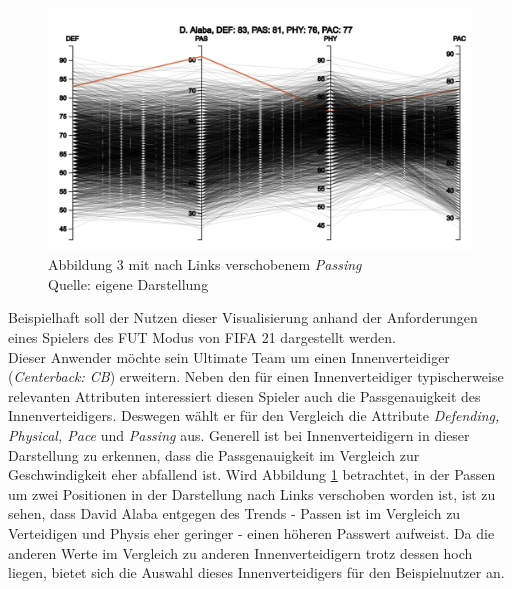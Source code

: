 \documentclass[usegeometry=true]{scrartcl}
\begin{document}
\begin{figure}[h!]
\centering
\includegraphics[scale=0.46]{grafiken/ParalleleKoordinaten51}
\caption{Abbildung 3 mit nach Links verschobenem \textit{Passing}\\ Quelle: eigene Darstellung}
\label{PK51}
\end{figure}
Beispielhaft soll der Nutzen dieser Visualisierung anhand der Anforderungen eines Spielers des FUT Modus von FIFA 21 dargestellt werden.\\
Dieser Anwender möchte sein Ultimate Team um einen Innenverteidiger (\textit{Centerback: CB}) erweitern. Neben den für einen Innenverteidiger typischerweise relevanten Attributen interessiert diesen Spieler auch die Passgenauigkeit des Innenverteidigers. Deswegen wählt er für den Vergleich die Attribute \textit{Defending, Physical, Pace} und \textit{Passing} aus. Generell ist bei Innenverteidigern in dieser Darstellung zu erkennen, dass die Passgenauigkeit im Vergleich zur Geschwindigkeit eher abfallend ist. Wird Abbildung \ref{PK51} betrachtet, in der Passen um zwei Positionen in der Darstellung nach Links verschoben worden ist, ist  zu sehen, dass David Alaba entgegen des Trends - Passen ist im Vergleich zu Verteidigen und Physis eher geringer - einen höheren Passwert aufweist. Da die anderen Werte im Vergleich zu anderen Innenverteidigern trotz dessen hoch liegen, bietet sich die Auswahl dieses Innenverteidigers für den Beispielnutzer an.
\end{document}
